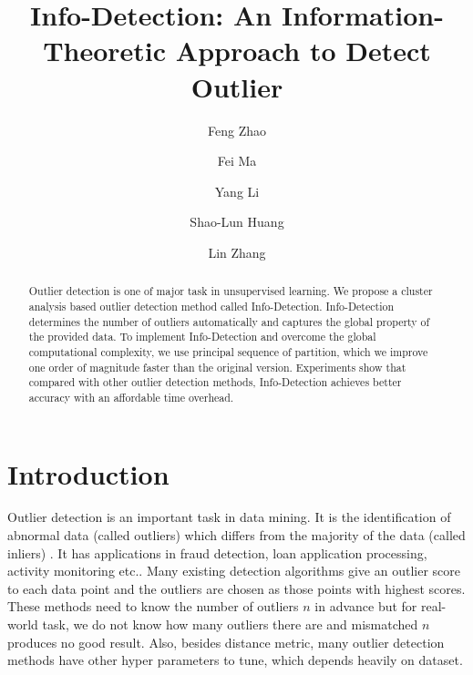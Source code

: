 \documentclass[runningheads]{llncs}
\begin{document}
%
\title{Info-Detection: An Information-Theoretic Approach to Detect Outlier}
%
%
\author{Feng Zhao \and
Fei Ma \and
Yang Li \and
Shao-Lun Huang  \and
Lin Zhang}
%
%
%
\maketitle              %
%
\begin{abstract}
Outlier detection is one of major task in unsupervised learning. We propose a cluster analysis based outlier detection method called Info-Detection. Info-Detection determines the number of outliers automatically and captures the global property of the provided data. To implement Info-Detection and overcome the global computational complexity, we use principal sequence of partition, which we improve one order of magnitude faster than the original version. Experiments show that compared with other outlier detection methods, Info-Detection achieves better accuracy with an affordable time overhead.

\end{abstract}
%
%
%
\section{Introduction}
Outlier detection is an important task in data mining. It is the identification of abnormal data (called outliers) which differs from the majority of the data (called inliers) \cite{grubbs1969procedures}. It has applications in fraud detection, loan application processing, activity monitoring etc.\cite{Hodge2004}. Many existing detection algorithms give an outlier score to each data point and the outliers are chosen as those points with highest scores. These methods need to know the number of outliers $n$ in advance but for real-world task, we do not know how many outliers there are and mismatched $n$ produces no good result. Also, besides distance metric, many outlier detection methods have other hyper parameters to tune, which depends heavily on dataset. 
\end{document}
